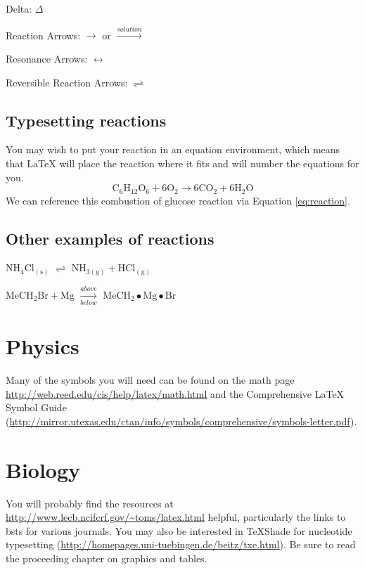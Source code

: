 \documentclass[12pt,twoside]{Mactemplate}
\theoremstyle{definition}
\theoremstyle{definition}
\theoremstyle{definition}
\theoremstyle{remark}
\begin{document}
\noindent Delta: \(\Delta\)

\noindent Reaction Arrows: \(\longrightarrow\) or
\(\xrightarrow{solution}\)

\noindent Resonance Arrows: \(\leftrightarrow\)

\noindent Reversible Reaction Arrows: \(\rightleftharpoons\)

\subsection{Typesetting reactions}\label{typesetting-reactions}

You may wish to put your reaction in an equation environment, which
means that LaTeX will place the reaction where it fits and will number
the equations for you.
\begin{equation}
  \mathrm{C_6H_{12}O_6  + 6O_2} \longrightarrow \mathrm{6CO_2 + 6H_2O}
  \label{eq:reaction}
\end{equation}
We can reference this combustion of glucose reaction via Equation
\eqref{eq:reaction}.

\subsection{Other examples of
reactions}\label{other-examples-of-reactions}

\(\mathrm{NH_4Cl_{(s)}}\) \(\rightleftharpoons\)
\(\mathrm{NH_{3(g)}+HCl_{(g)}}\)

\noindent \(\mathrm{MeCH_2Br + Mg}\) \(\xrightarrow[below]{above}\)
\(\mathrm{MeCH_2\bullet Mg \bullet Br}\)

\section{Physics}\label{physics}

Many of the symbols you will need can be found on the math page
\url{http://web.reed.edu/cis/help/latex/math.html} and the Comprehensive
LaTeX Symbol Guide
(\url{http://mirror.utexas.edu/ctan/info/symbols/comprehensive/symbols-letter.pdf}).

\section{Biology}\label{biology}

You will probably find the resources at
\url{http://www.lecb.ncifcrf.gov/~toms/latex.html} helpful, particularly
the links to bsts for various journals. You may also be interested in
TeXShade for nucleotide typesetting
(\url{http://homepages.uni-tuebingen.de/beitz/txe.html}). Be sure to
read the proceeding chapter on graphics and tables.
\end{document}
